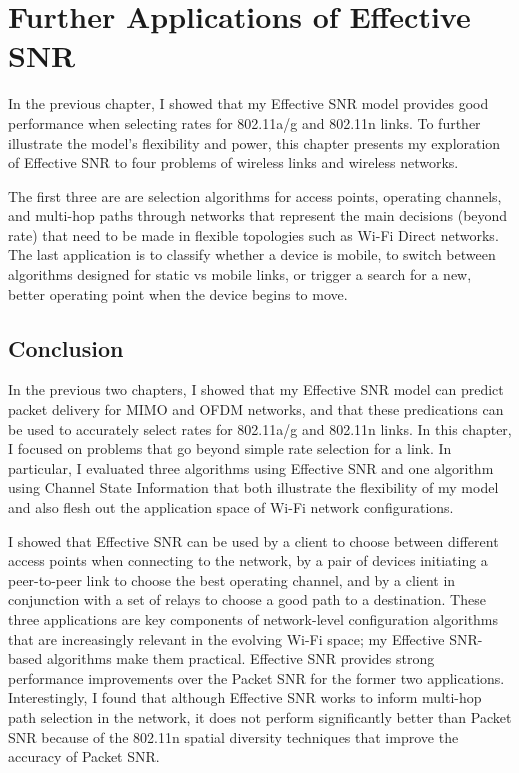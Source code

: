 \ifx\mainfile\undefined

\setcounter{chapter}{7} %
\fi

\cleardoublepage
\chapter{Further Applications of Effective SNR}
\label{chap:applications}

In the previous chapter, I showed that my Effective SNR model provides good performance when selecting rates for 802.11a/g and 802.11n links. To further illustrate the model's flexibility and power, this chapter presents my exploration of Effective SNR to four problems of wireless links and wireless networks.

The first three are are selection algorithms for access points, operating channels, and multi-hop paths through networks that represent the main decisions (beyond rate) that need to be made in flexible topologies such as Wi-Fi Direct networks. The last application is to classify whether a device is mobile, to switch between algorithms designed for static vs mobile links, or trigger a search for a new, better operating point when the device begins to move.






\section{Conclusion}
In the previous two chapters, I showed that my Effective SNR model can predict packet delivery for MIMO and OFDM networks, and that these predications can be used to accurately select rates for 802.11a/g and 802.11n links. In this chapter, I focused on problems that go beyond simple rate selection for a link. In particular, I evaluated three algorithms using Effective SNR and one algorithm using Channel State Information that both illustrate the flexibility of my model and also flesh out the application space of Wi-Fi network configurations.

I showed that Effective SNR can be used by a client to choose between different access points when connecting to the network, by a pair of devices initiating a peer-to-peer link to choose the best operating channel, and by a client in conjunction with a set of relays to choose a good path to a destination. These three applications are key components of network-level configuration algorithms that are increasingly relevant in the evolving Wi-Fi space; my Effective SNR-based algorithms make them practical. Effective SNR provides strong performance improvements over the Packet SNR for the former two applications. Interestingly, I found that although Effective SNR works to inform multi-hop path selection in the network, it does not perform significantly better than Packet SNR because of the 802.11n spatial diversity techniques that improve the accuracy of Packet SNR.

